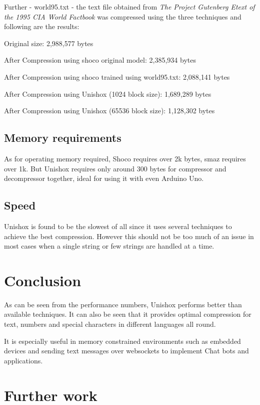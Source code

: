 \documentclass[]{article}
\begin{document}
Further - world95.txt - the text file obtained from \emph{The Project Gutenberg Etext of the 1995 CIA World Factbook} was compressed using the three techniques and following are the results:

Original size: 2,988,577 bytes

After Compression using shoco original model: 2,385,934 bytes

After Compression using shoco trained using world95.txt: 2,088,141 bytes

After Compression using Unishox (1024 block size): 1,689,289 bytes

After Compression using Unishox (65536 block size): 1,128,302 bytes

\subsection{Memory requirements}

As for operating memory required, Shoco requires over 2k bytes, smaz requires over 1k. But Unishox requires only around $300$ bytes for compressor and decompressor together, ideal for using it with even Arduino Uno.

\subsection{Speed}

Unishox is found to be the slowest of all since it uses several techniques to achieve the best compression.  However this should not be too much of an issue in most cases when a single string or few strings are handled at a time.

\section{Conclusion}

As can be seen from the performance numbers, Unishox performs better than available techniques.  It can also be seen that it provides optimal compression for text, numbers and special characters in different languages all round.

It is especially useful in memory constrained environments such as embedded devices and sending text messages over websockets to implement Chat bots and applications.

\section{Further work}
\end{document}
